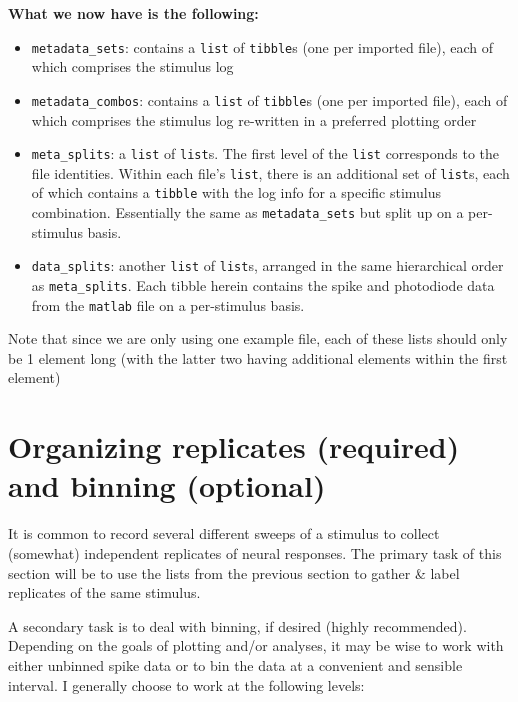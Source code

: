 \documentclass[
]{book}
\providecommand{\tightlist}{%
  \setlength{\itemsep}{0pt}\setlength{\parskip}{0pt}}
\begin{document}
\textbf{What we now have is the following:}

\begin{itemize}
\tightlist
\item
  \texttt{metadata\_sets}: contains a \texttt{list} of \texttt{tibble}s (one per imported file),
  each of which comprises the stimulus log
\item
  \texttt{metadata\_combos}: contains a \texttt{list} of \texttt{tibble}s (one per imported file),
  each of which comprises the stimulus log re-written in a preferred plotting
  order
\item
  \texttt{meta\_splits}: a \texttt{list} of \texttt{list}s. The first level of the \texttt{list}
  corresponds to the file identities. Within each file's \texttt{list}, there is an
  additional set of \texttt{list}s, each of which contains a \texttt{tibble} with the log
  info for a specific stimulus combination. Essentially the same as
  \texttt{metadata\_sets} but split up on a per-stimulus basis.
\item
  \texttt{data\_splits}: another \texttt{list} of \texttt{list}s, arranged in the same hierarchical
  order as \texttt{meta\_splits}. Each tibble herein contains the spike and photodiode
  data from the \texttt{matlab} file on a per-stimulus basis.
\end{itemize}

Note that since we are only using one example file, each of these lists should
only be 1 element long (with the latter two having additional elements within
the first element)

\hypertarget{organizing-replicates-required-and-binning-optional}{%
\section{Organizing replicates (required) and binning (optional)}\label{organizing-replicates-required-and-binning-optional}}

It is common to record several different sweeps of a stimulus to collect
(somewhat) independent replicates of neural responses. The primary task of this
section will be to use the lists from the previous section to gather \& label
replicates of the same stimulus.

A secondary task is to deal with binning, if desired (highly recommended).
Depending on the goals of plotting and/or analyses, it may be wise to work with
either unbinned spike data or to bin the data at a convenient and sensible
interval. I generally choose to work at the following levels:
\end{document}
